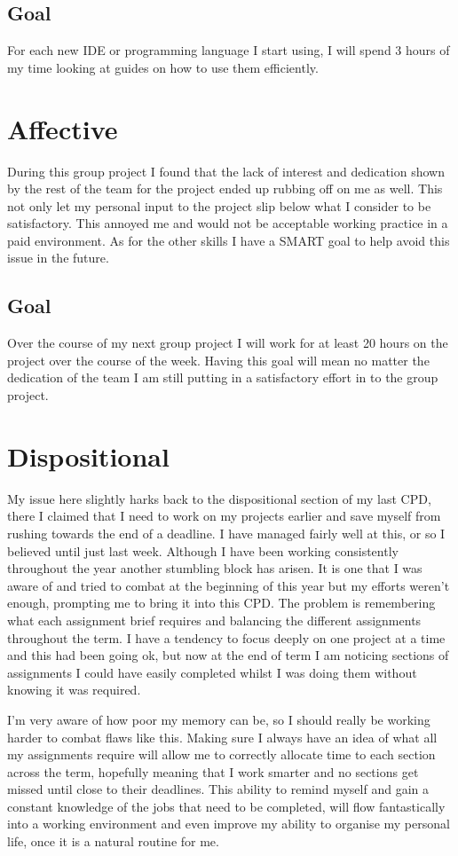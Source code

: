 \documentclass{scrartcl}
\begin{document}
\subsection{Goal}
For each new IDE or programming language I start using, I will spend 3 hours of my time looking at guides on how to use them efficiently.

\section{Affective}
During this group project I found that the lack of interest and dedication shown by the rest of the team for the project ended up rubbing off on me as well. This not only let my personal input to the project slip below what I consider to be satisfactory. This annoyed me and would not be acceptable working practice in a paid environment. As for the other skills I have a SMART goal to help avoid this issue in the future.
\subsection{Goal}
Over the course of my next group project I will work for at least 20 hours on the project over the course of the week. Having this goal will mean no matter the dedication of the team I am still putting in a satisfactory effort in to the group project.

\section{Dispositional}
My issue here slightly harks back to the dispositional section of my last CPD, there I claimed that I need to work on my projects earlier and save myself from rushing towards the end of a deadline. I have managed fairly well at this, or so I believed until just last week. Although I have been working consistently throughout the year another stumbling block has arisen. It is one that I was aware of and tried to combat at the beginning of this year but my efforts weren't enough, prompting me to bring it into this CPD. The problem is remembering what each assignment brief requires and balancing the different assignments throughout the term. I have a tendency to focus deeply on one project at a time and this had been going ok, but now at the end of term I am noticing sections of assignments I could have easily completed whilst I was doing them without knowing it was required. 

I'm very aware of how poor my memory can be, so I should really be working harder to combat flaws like this. Making sure I always have an idea of what all my assignments require will allow me to correctly allocate time to each section across the term, hopefully meaning that I work smarter and no sections get missed until close to their deadlines. This ability to remind myself and gain a constant knowledge of the jobs that need to be completed, will flow fantastically into a working environment and even improve my ability to organise my personal life, once it is a natural routine for me.
\end{document}
